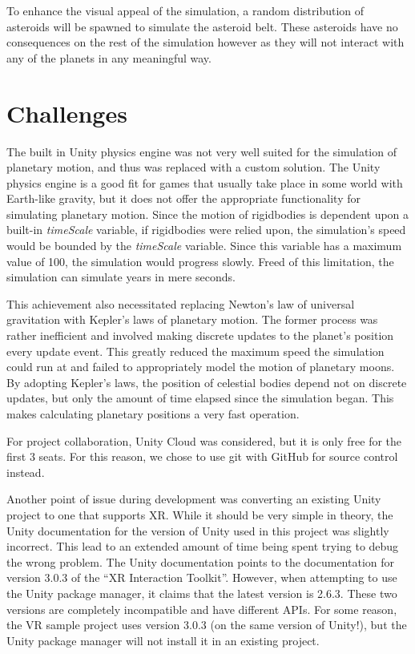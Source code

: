 \documentclass{article}
\begin{document}
    To enhance the visual appeal of the simulation, a random distribution of asteroids will be spawned to simulate the asteroid belt. These asteroids have no consequences on the rest of the simulation however as they will not interact with any of the planets in any meaningful way.
    \section{Challenges}
    
    The built in Unity physics engine was not very well suited for the simulation of planetary motion, and thus was replaced with a custom solution. The Unity physics engine is a good fit for games that usually take place in some world with Earth-like gravity, but it does not offer the appropriate functionality for simulating planetary motion. Since the motion of rigidbodies is dependent upon a built-in \emph{timeScale } variable, if rigidbodies were relied upon, the simulation's speed would be bounded by the \emph{timeScale} variable. Since this variable has a maximum value of 100, the simulation would progress slowly. Freed of this limitation, the simulation can simulate years in mere seconds.

    This achievement also necessitated replacing Newton's law of universal gravitation with Kepler's laws of planetary motion. The former process was rather inefficient and involved making discrete updates to the planet's position every update event. This greatly reduced the maximum speed the simulation could run at and failed to appropriately model the motion of planetary moons. By adopting Kepler's laws, the position of celestial bodies depend not on discrete updates, but only the amount of time elapsed since the simulation began. This makes calculating planetary positions a very fast operation.

    For project collaboration, Unity Cloud was considered, but it is only free for the first 3 seats. For this reason, we chose to use git with GitHub for source control instead.

    Another point of issue during development was converting an existing Unity project to one that supports XR. While it should be very simple in theory, the Unity documentation for the version of Unity used in this project was slightly incorrect. This lead to an extended amount of time being spent trying to debug the wrong problem. The Unity documentation points to the documentation for version 3.0.3 of the ``XR Interaction Toolkit''. However, when attempting to use the Unity package manager, it claims that the latest version is 2.6.3. These two versions are completely incompatible and have different APIs. For some reason, the VR sample project uses version 3.0.3 (on the same version of Unity!), but the Unity package manager will not install it in an existing project.
    \newpage
    
    
\end{document}
